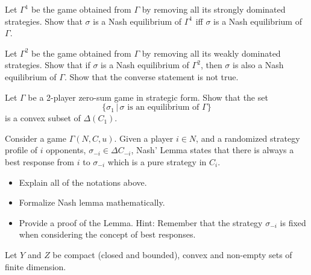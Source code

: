 \documentclass{../ape}
\begin{document}

\thex{}
Let $\Gamma^1$ be the game obtained from $\Gamma$ by removing all its strongly dominated strategies. Show that $\sigma$ is a Nash equilibrium of $\Gamma^1$ iff $\sigma$ is a Nash equilibrium of $\Gamma$.

\thex{}
Let $\Gamma^2$ be the game obtained from $\Gamma$ by removing all its weakly dominated strategies. Show that if $\sigma$ is a Nash equilibrium of $\Gamma^2$, then $\sigma$ is also a Nash equilibrium of $\Gamma$. Show that the converse statement is not true.

\thex{}
Let $\Gamma$ be a 2-player zero-sum game in strategic form. Show that the set $$\{ \sigma_1 \, | \, \sigma \text{ is an equilibrium of } \Gamma \}$$ is a convex subset of $\Delta(C_1)$.

\thex{}
Consider a game $\Gamma(N,C,u)$. Given a player $i \in N$, and a randomized strategy profile of $i$ opponents, $\sigma_{-i} \in \Delta C_{-i}$, Nash' Lemma states that there is always a best response from $i$ to $\sigma_{-i}$ which is a pure strategy in $C_i$. 
\begin{itemize}
\item Explain all of the notations above.
\item Formalize Nash lemma mathematically.
\item Provide a proof of the Lemma. Hint: Remember that the strategy $\sigma_{-i}$ is fixed when considering the concept of best responses. 
\end{itemize} 

\thex{} Let $Y$ and $Z$ be compact (closed and bounded), convex and non-empty sets of finite dimension. 
%
%
%
\end{document}
